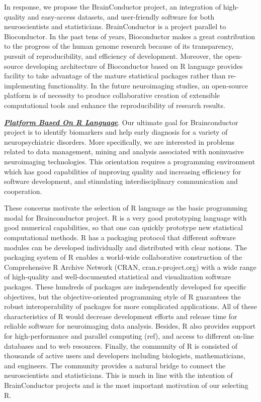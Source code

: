 \documentclass{nature}
\begin{document}
In response, we propose the BrainConductor project, an integration of high-quality and easy-access datasets, and user-friendly software for both neuroscientists and statisticians. BrainConductor is a project parallel to Bioconductor. In the past tens of years, Bioconductor \cite{gentleman2004bioconductor} makes a great contribution to the progress of the human genome research because of its transparency, pursuit of reproducibility, and efficiency of development. Moreover, the open-source developing architecture of Bioconductor based on R language provides facility to take advantage of the mature statistical packages rather than re-implementing functionality. In the future neuroimaging studies, an open-source platform is of necessity to produce collaborative creation of extensible computational tools and enhance the reproducibility of research results. 

\underline{\textit{\textbf{Platform Based On R Language}}}. Our ultimate goal for Brainconductor project is to identify biomarkers and help early diagnosis for a variety of neuropsychiatric disorders. More specifically, we are interested in problems related to data management, mining and analysis associated with noninvasive neuroimaging technologies. This orientation requires a programming environment which has good capabilities of improving quality and increasing efficiency for software development, and stimulating interdisciplinary communication and cooperation.

These concerns motivate the selection of R language as the basic programming modal for Brainconductor project. R is a very good prototyping language with good numerical capabilities, so that one can quickly prototype new statistical computational methods. R has a packaging protocol that different software modules can be developed individually and distributed with clear notions. The packaging system of R enables a world-wide collaborative construction of the Comprehensive R Archive Network (CRAN, cran.r-project.org) with a wide range of high-quality and well-documented statistical and visualization software packages. These hundreds of packages are independently developed for specific objectives, but the objective-oriented programming style of R guarantees the robust interoperability of packages for more complicated applications. All of these characteristics of R would decrease development efforts and release time for reliable software for neuroimaging data analysis. Besides, R also provides support for high-performance and parallel computing (ref), and access to different on-line databases and to web resources. Finally, the community of R is consisted of thousands of active users and developers including biologists, mathematicians, and engineers. The community provides a natural bridge to connect the neuroscientists and statisticians. This is much in line with the intention of BrainConductor projects and is the most important motivation of our selecting R.  
\end{document}
